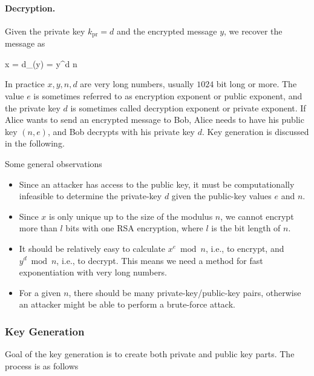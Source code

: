 \paragraph{Decryption.} Given the private key $k_{\text{pr}} = d$ and the encrypted message $y$, we recover the message as

\bee
x = d_{}(y) = y^d \bmod n
\eee

In practice $x, y, n, d$ are very long numbers, usually $1024$ bit long or more. The value $e$ is sometimes referred to as encryption exponent or public exponent, and the private key $d$ is sometimes called decryption exponent or private exponent. If Alice wants to send an encrypted message to Bob, Alice needs to have his public key $(n, e)$, and Bob decrypts with his private key $d$. Key generation is discussed in the following.

Some general observations

\begin{itemize}

\item Since an attacker has access to the public key, it must be computationally infeasible to determine the private-key $d$ given the public-key values $e$ and $n$. 

\item Since $x$ is only unique up to the size of the modulus $n$, we cannot encrypt more than $l$ bits with one RSA encryption, where $l$ is the bit length of $n$.

\item It should be relatively easy to calculate $x^ e \bmod n$, i.e., to encrypt, and $y^d \bmod n$, i.e., to decrypt. This means we need a method for fast exponentiation with very long numbers.

\item For a given $n$, there should be many private-key/public-key pairs, otherwise an attacker might be able to perform a brute-force attack.

\end{itemize}


\subsubsection{Key Generation}

Goal of the key generation is to create both private and public key parts. The process is as follows

